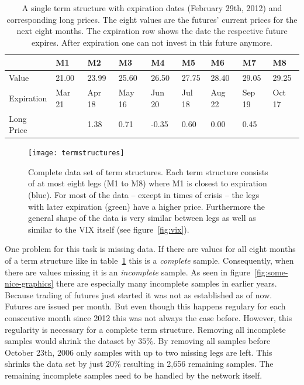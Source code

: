 \begin{table}
	\centering
	\caption[Single term structure with expiration dates (February 29th, 2012)]{A single term structure with expiration dates (February 29th, 2012) and corresponding long prices. The eight values are the futures' current prices for the next eight months. The expiration row shows the date the respective future expires. After expiration one can not invest in this future anymore.}
	\begin{tabular}{lllllllll}
	\toprule
	{} &      M1 &      M2 &      M3 &      M4 &      M5 &      M6 &      M7 &      M8 \\
	\midrule
	Value      &   21.00 &   23.99 &   25.60 &   26.50 &   27.75 &   28.40 &   29.05 &   29.25 \\
	Expiration &  Mar 21 &  Apr 18 &  May 16 &  Jun 20 &  Jul 18 &  Aug 22 &  Sep 19 &  Oct 17 \\
    \midrule	
    Long Price &         &    1.38 &    0.71 &   -0.35 &    0.60 &    0.00 &    0.45 &         \\
	\bottomrule
	\end{tabular}
 	\label{tab:single-termstructure}
\end{table}

\begin{figure}
	\centering
	\texttt{[image: termstructures]}
	\caption[Complete data set of term structures]{%
		Complete data set of term structures. Each term structure consists of at most eight legs (M1 to M8) where M1 is closest to expiration (blue). For most of the data -- except in times of crisis -- the legs with later expiration (green) have a higher price. Furthermore the general shape of the data is very similar between legs as well as similar to the VIX itself (see figure~\ref{fig:vix}).}
	\label{fig:termstructures}
\end{figure}

One problem for this task is missing data. If there are values for all eight months of a term structure like in table~\ref{tab:single-termstructure} this is a \emph{complete} sample. Consequently, when there are values missing it is an \emph{incomplete} sample. As seen in figure~\ref{fig:some-nice-graphics} there are especially many incomplete samples in earlier years. Because trading of futures just started it was not as established as of now. Futures are issued per month. But even though this happens regulary for each consecutive month since 2012 this was not always the case before. However, this regularity is necessary for a complete term structure. Removing all incomplete samples would shrink the dataset by $35\%$. 
By removing all samples before October 23th, 2006 only samples with up to two missing legs are left. This shrinks the data set by just $20\%$ resulting in 2,656 remaining samples. The remaining incomplete samples need to be handled by the network itself.

